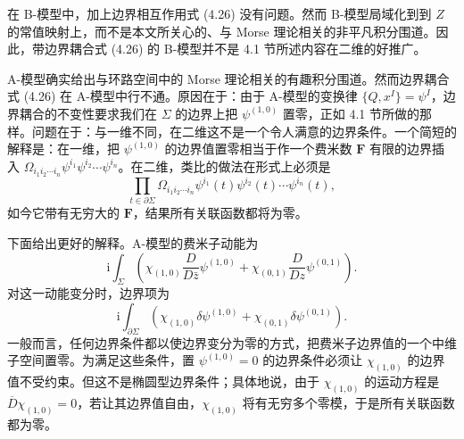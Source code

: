 \documentclass[11pt,a4paper,UTF8]{ctexart}
\theoremstyle{plain}
\theoremstyle{definition}
\begin{document}
在 B-模型中，加上边界相互作用式 (4.26) 没有问题。然而 B-模型局域化到到 $Z$ 的常值映射上，而不是本文所关心的、与 Morse 理论相关的非平凡积分围道。因此，带边界耦合式 (4.26) 的 B-模型并不是 4.1 节所述内容在二维的好推广。

A-模型确实给出与环路空间中的 Morse 理论相关的有趣积分围道。然而边界耦合式 (4.26) 在 A-模型中行不通。原因在于：由于 A-模型的变换律 $\{Q,x^I\}=\psi^I$，边界耦合的不变性要求我们在 $\Sigma$ 的边界上把 $\psi^{(1,0)}$ 置零，正如 4.1 节所做的那样。问题在于：与一维不同，在二维这不是一个令人满意的边界条件。一个简短的解释是：在一维，把 $\psi^{(1,0)}$ 的边界值置零相当于作一个费米数 $\boldsymbol{F}$ 有限的边界插入 $\Omega_{i_1i_2\cdots i_n}\psi^{i_1}\psi^{i_2}\cdots\psi^{i_n}$。在二维，类比的做法在形式上必须是
\begin{equation}
    \prod_{t\in\partial\Sigma}\Omega_{i_1i_2\cdots i_n}
    \psi^{i_1}(t)\psi^{i_2}(t)\cdots\psi^{i_n}(t),
    \tag{4.27}
\end{equation}
如今它带有无穷大的 $\boldsymbol{F}$，结果所有关联函数都将为零。


下面给出更好的解释。A-模型的费米子动能为
\begin{equation}
    \mathrm{i}\int_\Sigma\left(
    \chi_{(1,0)}\frac{D}{D\bar z}\psi^{(1,0)}
    +\chi_{(0,1)}\frac{D}{Dz}\psi^{(0,1)}\right).
    \tag{4.28}
\end{equation}
对这一动能变分时，边界项为
\begin{equation}
    \mathrm{i}\int_{\partial\Sigma}\left(
    \chi_{(1,0)}\delta\psi^{(1,0)}
    +\chi_{(0,1)}\delta\psi^{(0,1)}\right).
    \tag{4.29}
\end{equation}
一般而言，任何边界条件都以使边界变分为零的方式，把费米子边界值的一个中维子空间置零。为满足这些条件，置 $\psi^{(1,0)}=0$ 的边界条件必须让 $\chi_{(1,0)}$ 的边界值不受约束。但这不是椭圆型边界条件；具体地说，由于 $\chi_{(1,0)}$ 的运动方程是 $\overline{D}\chi_{(1,0)}=0$，若让其边界值自由，$\chi_{(1,0)}$ 将有无穷多个零模，于是所有关联函数都为零。

\end{document}

